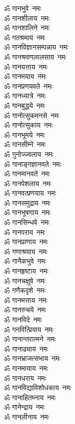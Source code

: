 \begin{multicols}{2}
\begin{flushleft}
ॐ गानभुवे~नमः\\
ॐ गानशीलाय~नमः\\
ॐ गानशालिने~नमः\\
ॐ गतश्रमाय~नमः\\
ॐ गानविज्ञानसम्पन्नाय~नमः\\
ॐ गानश्रवणलालसाय~नमः\hfill{}\\
ॐ गानयत्ताय~नमः\\
ॐ गानमयाय~नमः\\
ॐ गानप्रणयवते~नमः\\
ॐ गानध्यात्रे~नमः\\
ॐ गानबुद्धये~नमः\\
ॐ  गानोत्सुकमनसे~नमः\\
ॐ गानोत्सुकाय~नमः\\
ॐ गानभूमये~नमः\\
ॐ गानसीम्ने~नमः\\
ॐ गुनोज्ज्वलाय~नमः\hfill{}\\
ॐ गानाङ्गज्ञानवते~नमः\\
ॐ गानमानवते~नमः\\
ॐ गानपेशलाय~नमः\\
ॐ गानवत्प्रणयाय~नमः\\
ॐ गानसमुद्राय~नमः\\
ॐ गानभूषणाय~नमः\\
ॐ गानसिन्धवे~नमः\\
ॐ गानपराय~नमः\\
ॐ गानप्राणाय~नमः\\
ॐ गणाश्रयाय~नमः\hfill{}\\
ॐ गानैकभुवे~नमः\\
ॐ गानहृष्टाय~नमः\\
ॐ गानचक्षुषे~नमः\\
ॐ गणैकदृशे~नमः\\
ॐ गानमत्ताय~नमः\\
ॐ गानरुचये~नमः\\
ॐ गानविदे~नमः\\
ॐ गनवित्प्रियाय~नमः\\
ॐ गानान्तरात्मने~नमः\\
ॐ गानाढ्याय~नमः\hfill{}\\
ॐ गानभ्राजत्सभाय~नमः\\
ॐ गानमायाय~नमः\\
ॐ गानधराय~नमः\\
ॐ गानविद्याविशोधकाय~नमः\\
ॐ गानाहितघ्नाय~नमः\\
ॐ गानेन्द्राय~नमः\\
ॐ गानलीनाय~नमः\\

\end{flushleft}
\end{multicols}

